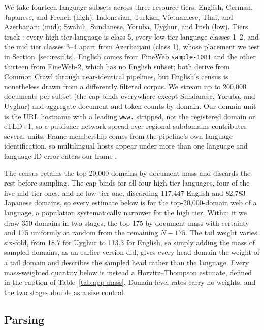 \documentclass[11pt]{article}
\begin{document}
We take fourteen language subsets across three resource tiers: English, German, Japanese, and French (high); Indonesian, Turkish, Vietnamese, Thai, and Azerbaijani (mid); Swahili, Sundanese, Yoruba, Uyghur, and Irish (low). Tiers track \citet{joshi2020state}: every high-tier language is class 5, every low-tier language classes 1--2, and the mid tier classes 3--4 apart from Azerbaijani (class 1), whose placement we test in Section~\ref{sec:results}. English comes from FineWeb \texttt{sample-10BT} and the other thirteen from FineWeb-2, which has no English subset; both derive from Common Crawl through near-identical pipelines, but English's census is nonetheless drawn from a differently filtered corpus. We stream up to 200,000 documents per subset (the cap binds everywhere except Sundanese, Yoruba, and Uyghur) and aggregate document and token counts by domain. Our domain unit is the URL hostname with a leading \texttt{www.} stripped, not the registered domain or eTLD+1, so a publisher network spread over regional subdomains contributes several units. Frame membership comes from the pipeline's own language identification, so multilingual hosts appear under more than one language and language-ID error enters our frame \citep{caswell2020langid}.

The census retains the top 20,000 domains by document mass and discards the rest before sampling. The cap binds for all four high-tier languages, four of the five mid-tier ones, and no low-tier one, discarding 117,447 English and 82,783 Japanese domains, so every estimate below is for the top-20,000-domain web of a language, a population systematically narrower for the high tier. Within it we draw 350 domains in two stages, the top 175 by document mass with certainty and 175 uniformly at random from the remaining $N-175$. The tail weight varies six-fold, from 18.7 for Uyghur to 113.3 for English, so simply adding the mass of sampled domains, as an earlier version did, gives every head domain the weight of a tail domain and describes the sampled head rather than the language. Every mass-weighted quantity below is instead a Horvitz--Thompson estimate, defined in the caption of Table~\ref{tab:app-mass}. Domain-level rates carry no weights, and the two stages double as a size control.

\subsection{Parsing}
\end{document}
